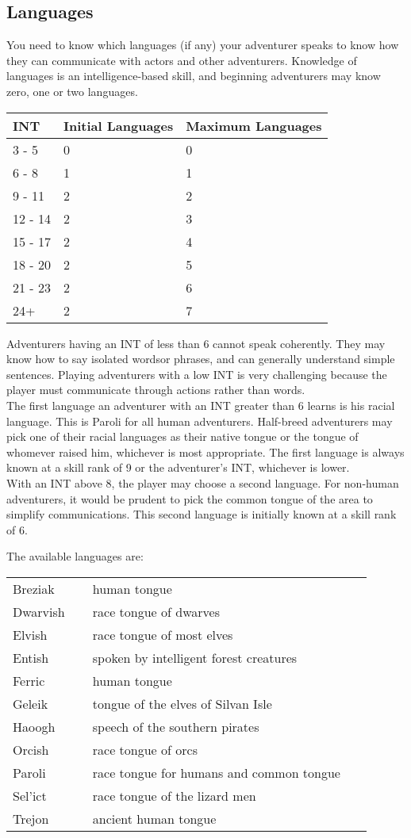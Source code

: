 \begin{multicols}{2}
\section{Languages}
You need to know which languages (if any) your adventurer speaks to know how they can communicate with actors and other adventurers. Knowledge of languages is an intelligence-based skill, and beginning adventurers may know zero, one or two languages.
\begin{tcolorbox}[breakable,boxrule=0pt]
\begin{tabular}{l l l}
INT & Initial Languages & Maximum Languages\\
\midrule
3 - 5 & 0 & 0\\
6 - 8 & 1 & 1\\
9 - 11 & 2 & 2\\
12 - 14 & 2 & 3\\
15 - 17 & 2 & 4\\
18 - 20 & 2 & 5\\
21 - 23 & 2 & 6\\
24+ & 2 & 7\\
\end{tabular}
\end{tcolorbox}
Adventurers having an INT of less than 6 cannot speak coherently. They may know how to say isolated wordsor phrases, and can generally understand simple sentences. Playing adventurers with a low INT is very challenging because the player must communicate through actions rather than words. \\
The first language an adventurer with an INT greater than 6 learns is his racial language. This is Paroli for all human adventurers. Half-breed adventurers may pick one of their racial languages as their native tongue or the tongue of whomever raised him, whichever is most appropriate. The first language is always known at a skill rank of 9 or the adventurer’s INT, whichever is lower.\\
With an INT above 8, the player may choose a second language. For non-human adventurers, it would be prudent to pick the common tongue of the area to simplify communications. This second language is initially known at a skill rank of 6.

The available languages are:

\begin{tabular}{p{0.2\linewidth} p{0.7\linewidth}}
Breziak & human tongue\\
Dwarvish & race tongue of dwarves\\
Elvish & race tongue of most elves\\
Entish & spoken by intelligent forest creatures\\
Ferric & human tongue\\
Geleik & tongue of the elves of Silvan Isle\\
Haoogh & speech of the southern pirates\\
Orcish & race tongue of orcs\\
Paroli & race tongue for humans and common tongue\\
Sel’ict & race tongue of the lizard men\\
Trejon & ancient human tongue\\
\end{tabular}

\end{multicols}
